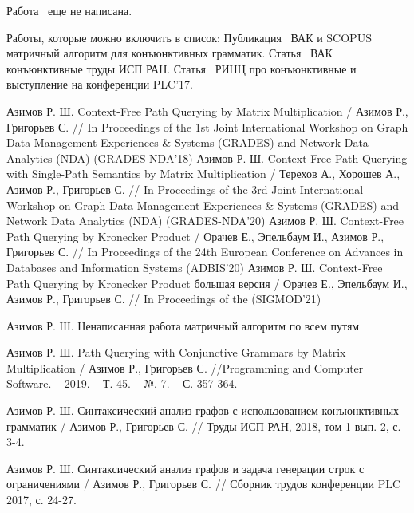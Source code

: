  Работа~\cite{5} еще не написана.
 
 Работы, которые можно включить в список: Публикация~\cite{6} ВАК и SCOPUS матричный алгоритм для конъюнктивных грамматик. Статья~\cite{7} ВАК конъюнктивные труды ИСП РАН. Статья~\cite{8} РИНЦ про конъюнктивные и выступление на конференции PLC'17.






\begin{thebibliography}{99}
	 Азимов Р. Ш. Context-Free Path Querying by
	Matrix Multiplication / Азимов Р., Григорьев С. // In Proceedings of the
	1st Joint International Workshop on Graph Data Management Experiences \&
	Systems (GRADES) and Network Data Analytics (NDA) (GRADES-NDA’18)
	 Азимов Р. Ш. Context-Free Path Querying with Single-Path Semantics by
	Matrix Multiplication / Терехов А., Хорошев А., Азимов Р., Григорьев С. // In Proceedings of the
	3rd Joint International Workshop on Graph Data Management Experiences \&
	Systems (GRADES) and Network Data Analytics (NDA) (GRADES-NDA’20)
	 Азимов Р. Ш. Context-Free Path Querying by Kronecker
	Product / Орачев Е., Эпельбаум И., Азимов Р., Григорьев С. // In Proceedings of the
	24th European Conference on Advances in Databases and Information Systems (ADBIS’20)
	 Азимов Р. Ш. Context-Free Path Querying by Kronecker
	Product большая версия / Орачев Е., Эпельбаум И., Азимов Р., Григорьев С. // In Proceedings of the (SIGMOD’21)
	
	 Азимов Р. Ш. Ненаписанная работа матричный алгоритм по всем путям
	
	 Азимов Р. Ш. Path Querying with Conjunctive Grammars by Matrix Multiplication / Азимов Р., Григорьев С. //Programming and Computer Software. – 2019. – Т. 45. – №. 7. – С. 357-364.
	\setcounter{firstbib}{\value{enumiv}}
	
	
	
	 Азимов Р. Ш. Синтаксический анализ графов с использованием конъюнктивных грамматик / Азимов Р., Григорьев С. // Труды ИСП РАН, 2018, том 1 вып. 2, с. 3-4.
	
	 Азимов Р. Ш. Синтаксический анализ графов и задача генерации строк с ограничениями / Азимов Р., Григорьев С. // Сборник трудов конференции PLC 2017, с. 24-27.
\end{thebibliography}

